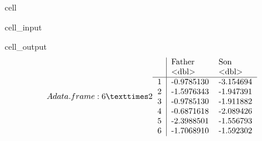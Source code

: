 \documentclass[letterpaper,10pt,english]{jupyterBook}
\begin{document}
\begin{sphinxuseclass}{cell}\begin{sphinxVerbatimInput}

\begin{sphinxuseclass}{cell_input}
\begin{sphinxVerbatim}[commandchars=\\\{\}]

\end{sphinxVerbatim}

\end{sphinxuseclass}\end{sphinxVerbatimInput}
\begin{sphinxVerbatimOutput}

\begin{sphinxuseclass}{cell_output}\begin{equation*}
\begin{split}A data.frame: 6 × 2
\begin{tabular}{r|ll}
  & Father & Son\\
  & <dbl> & <dbl>\\
\hline
	1 & -0.9785130 & -3.154694\\
	2 & -1.5976343 & -1.947391\\
	3 & -0.9785130 & -1.911882\\
	4 & -0.6871618 & -2.089426\\
	5 & -2.3988501 & -1.556793\\
	6 & -1.7068910 & -1.592302\\
\end{tabular}\end{split}
\end{equation*}
\end{sphinxuseclass}\end{sphinxVerbatimOutput}

\end{sphinxuseclass}
\end{document}
